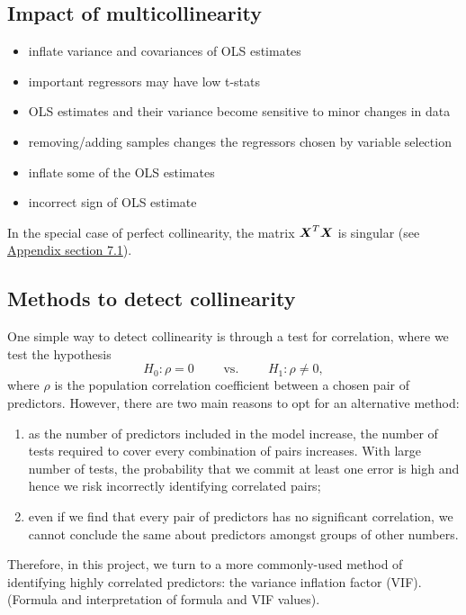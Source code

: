 \documentclass[12pt]{article}
\begin{document}
	\subsection{Impact of multicollinearity}
	\begin{itemize}
		\item inflate variance and covariances of OLS estimates 
		\item important regressors may have low t-stats 
		\item  OLS estimates and their variance become sensitive to minor changes in data
		\item removing/adding samples changes the regressors chosen by variable selection
		\item  inflate some of the OLS estimates
		\item  incorrect sign of OLS estimate
	\end{itemize}
	
	In the special case of perfect collinearity, the matrix $\boldsymbol{X}^T\boldsymbol{X}$ is singular (see \hyperref[sec:append1]{Appendix section 7.1}).
	
	\subsection{Methods to detect collinearity}
	
	One simple way to detect collinearity is through a test for correlation, where we test the hypothesis
	$$H_0: \rho=0 \quad\quad\text{ vs. }\quad\quad H_1: \rho\neq 0,$$
	where $\rho$ is the population correlation coefficient between a chosen pair of predictors. However, there are two main reasons to opt for an alternative method: 
	\begin{enumerate}
		\item as the number of predictors included in the model increase, the number of tests required to cover every combination of pairs increases. With large number of tests, the probability that we commit at least one error is high and hence we risk incorrectly identifying correlated pairs;
		\item even if we find that every pair of predictors has no significant correlation, we cannot conclude the same about predictors amongst groups of other numbers. 
	\end{enumerate}
	
	Therefore, in this project, we turn to a more commonly-used method of identifying highly correlated predictors: the variance inflation factor (VIF). (Formula and interpretation of formula and VIF values).\\
	
\end{document}
